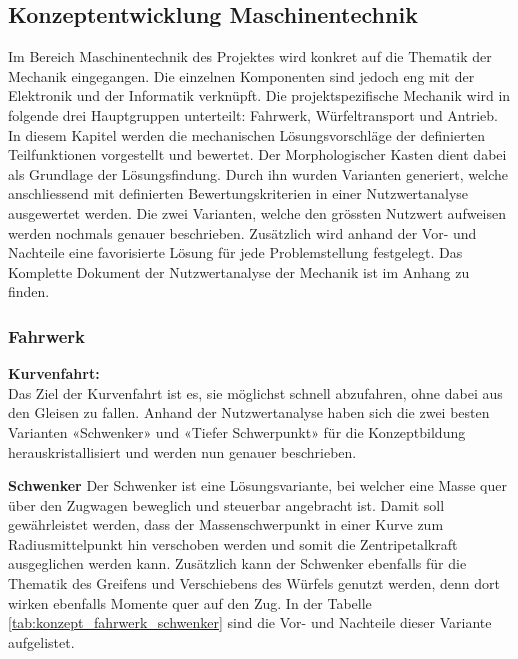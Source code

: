 \documentclass[../../main.tex]{subfiles}
\begin{document}
    \subsection{Konzeptentwicklung Maschinentechnik}
    Im Bereich Maschinentechnik des Projektes wird konkret auf die Thematik der Mechanik eingegangen. Die einzelnen Komponenten sind jedoch eng mit der Elektronik und der Informatik verknüpft. Die projektspezifische Mechanik wird in folgende drei Hauptgruppen unterteilt: Fahrwerk, Würfeltransport und Antrieb. In diesem Kapitel werden die mechanischen Lösungsvorschläge der definierten Teilfunktionen vorgestellt und bewertet. Der Morphologischer Kasten dient dabei als Grundlage der Lösungsfindung. Durch ihn wurden Varianten generiert, welche anschliessend mit definierten Bewertungskriterien in einer Nutzwertanalyse ausgewertet werden. Die zwei Varianten, welche den grössten Nutzwert aufweisen werden nochmals genauer beschrieben. Zusätzlich wird anhand der Vor- und Nachteile eine favorisierte Lösung für jede Problemstellung festgelegt. Das Komplette Dokument der Nutzwertanalyse der Mechanik ist im Anhang zu finden.\\

    \subsubsection{Fahrwerk}
    \textbf{Kurvenfahrt:}\\
    Das Ziel der Kurvenfahrt ist es, sie möglichst schnell abzufahren, ohne dabei aus den Gleisen zu fallen. Anhand der Nutzwertanalyse haben sich die zwei besten Varianten «Schwenker» und «Tiefer Schwerpunkt» für die Konzeptbildung herauskristallisiert und werden nun genauer beschrieben.
    
    \textbf{Schwenker}
    Der Schwenker ist eine Lösungsvariante, bei welcher eine Masse quer über den Zugwagen beweglich und steuerbar angebracht ist. Damit soll gewährleistet werden, dass der Massenschwerpunkt in einer Kurve zum Radiusmittelpunkt hin verschoben werden und somit die Zentripetalkraft ausgeglichen werden kann. Zusätzlich kann der Schwenker ebenfalls für die Thematik des Greifens und Verschiebens des Würfels genutzt werden, denn dort wirken ebenfalls Momente quer auf den Zug. In der Tabelle \ref{tab:konzept_fahrwerk_schwenker} sind die Vor- und Nachteile dieser Variante aufgelistet.
    
\end{document}
